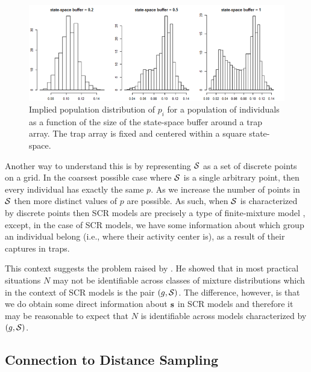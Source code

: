 \begin{figure}
\begin{center}
\includegraphics[width=5in]{Ch4/figs/buffereffect}
\end{center}
\caption{Implied population distribution of $p_{i}$ for a population
  of individuals as a function of the size of the state-space buffer
  around a trap array. The trap array is fixed and centered within a
  square state-space.}
\label{scr0.fig.buffereffect}
\end{figure}

Another way to understand this is by representing ${\cal S}$ as a set
of discrete points on a grid. In the coarsest possible case where
${\cal S}$ is a single arbitrary point, then every individual has
exactly the same $p$. As we increase the number of points in ${\cal
  S}$ then more distinct values of $p$ are possible. As such, when
${\cal S}$ is characterized by discrete points then SCR models are
precisely a type of finite-mixture model \citep{norris_pollock:1996,
  pledger:2000}, except, in the case of SCR models, we have some information about which
group an individual belong (i.e., where their activity center is), as
a result of their captures in traps.

This context suggests the problem raised by \citet{link:2003}. He
showed that in most practical situations $N$ may not be identifiable
across classes of mixture distributions which in the context of SCR
models is the pair $(g, {\cal S})$.  The difference, however, is that
we do obtain some direct information about ${\bf s}$ in SCR models and
therefore it may be reasonable to expect that
$N$ is identifiable across models characterized by $(g,{\cal
  S})$.

\subsection{Connection to Distance Sampling}

